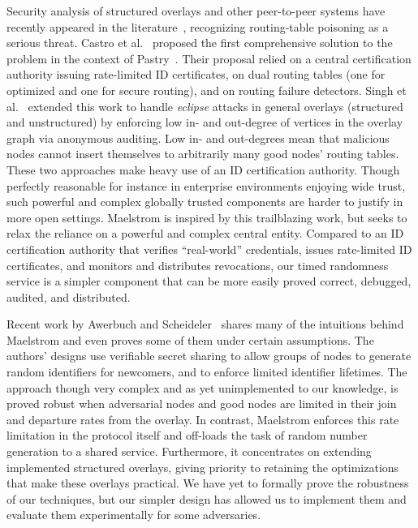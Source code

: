 \documentclass[10pt,twocolumn]{article}
\begin{document}
Security analysis of structured overlays and 
other peer-to-peer systems have recently appeared in the
literature~\cite{Douceur2002,Sit2002,Wallach2002}, recognizing 
routing-table poisoning as a serious threat.
Castro et al.~\cite{Castro2002} proposed the first comprehensive
solution to the problem in the context of
Pastry~\cite{Rowstron2001}. Their proposal relied on a central certification authority
issuing rate-limited ID certificates, on dual
routing tables (one for optimized and one for secure routing),
and on routing failure detectors.  Singh et al.~\cite{Singh2004} extended this work to handle
\emph{eclipse} attacks in general overlays (structured and unstructured)
by enforcing low in- and out-degree of vertices in the overlay graph via
anonymous auditing.  Low in- and out-degrees mean that malicious nodes cannot
insert themselves to arbitrarily many good nodes' routing tables.
These two approaches make heavy use of an ID certification authority.
Though perfectly
reasonable for instance in enterprise environments enjoying wide
trust, such powerful and complex globally
trusted components are harder to justify in more open settings.
Maelstrom is inspired by this trailblazing work, but seeks to relax the reliance
on a powerful and complex central entity. Compared to an ID certification
authority that verifies ``real-world'' credentials, issues
rate-limited ID certificates, and monitors and distributes revocations, our
timed randomness service is a simpler component that can be more easily
proved correct, debugged, audited, and distributed.

Recent work by Awerbuch and
Scheideler~\cite{Awerbuch2004,Scheideler2005} shares
many of the intuitions behind Maelstrom and even proves some of them
under certain assumptions. The authors' designs use verifiable secret sharing to allow
groups of nodes to generate random identifiers for newcomers, and to enforce
limited identifier lifetimes.  The approach though very complex and as
yet unimplemented to our knowledge, is proved 
robust when adversarial nodes and good nodes are limited in their join
and departure rates from the overlay.  In contrast, Maelstrom 
enforces this rate limitation in the protocol itself and
off-loads the task of random number generation to a shared service.
Furthermore, it concentrates on extending implemented structured overlays, giving
priority to retaining the optimizations that make these overlays practical.
We have yet to formally prove the robustness of our techniques, but our
simpler design has allowed us to implement them and evaluate them
experimentally for some adversaries.
\end{document}
